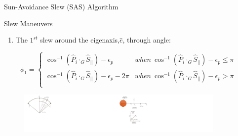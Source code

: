 \documentclass{beamer}
\begin{document}
\begin{frame}{Sun-Avoidance Slew (SAS) Algorithm}
\begin{block}{Slew Maneuvers}
\begin{enumerate}
\item The $1^{st}$ slew around the eigenaxis,$\hat{e}$, through angle:
\end{enumerate}
 \begin{equation}
 \phi_1=\left\{
                \begin{array}{ll}
                 \cos^{-1}(\hat{P}_i\cdot_G\hat{S}_{||})-\epsilon_p& when\  \cos^{-1}(\hat{P}_i\cdot_G\hat{S}_{||})-\epsilon_p\leq \pi\\
                 \cos^{-1}(\hat{P}_i\cdot_G\hat{S}_{||})-\epsilon_p-2\pi& when\ \cos^{-1}(\hat{P}_i\cdot_G\hat{S}_{||})-\epsilon_p>\pi\\
                \end{array}
              \right.
 \end{equation}
\begin{figure}
\includegraphics[width=2in]{./Figures/SVAS_1r_modified}\includegraphics[width=2in]{./Figures/SVAS_1rb_modified}
\end{figure}
\end{block}
\end{frame}
%
\end{document}
